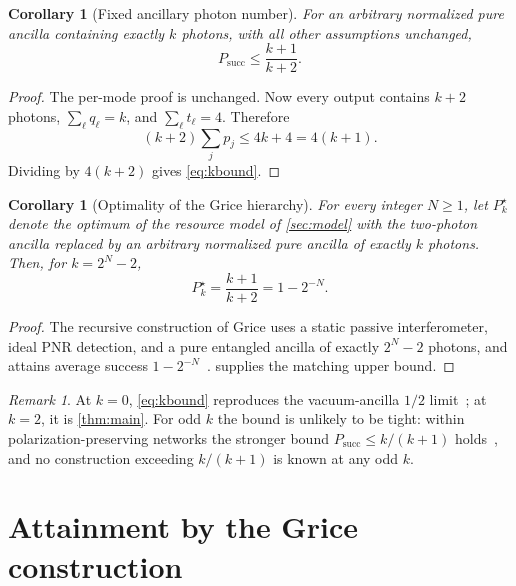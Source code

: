 \documentclass[11pt]{article}
\newtheorem{corollary}[theorem]{Corollary}
\theoremstyle{remark}
\newtheorem{remark}[theorem]{Remark}
\newcommand{\psucc}{P_{\mathrm{succ}}}
\begin{document}
\begin{corollary}[Fixed ancillary photon number]
\label{cor:k}
For an arbitrary normalized pure ancilla containing exactly \(k\) photons,
with all other assumptions unchanged,
\begin{equation}
  \psucc\le\frac{k+1}{k+2}.
  \label{eq:kbound}
\end{equation}
\end{corollary}

\begin{proof}
The per-mode proof is unchanged. Now every output contains \(k+2\) photons,
\(\sum_\ell q_\ell=k\), and \(\sum_\ell t_\ell=4\). Therefore
\begin{equation}
  (k+2)\sum_jp_j\le4k+4=4(k+1).
\end{equation}
Dividing by \(4(k+2)\) gives \cref{eq:kbound}.
\end{proof}

\begin{corollary}[Optimality of the Grice hierarchy]
\label{cor:hierarchy}
For every integer \(N\ge1\), let \(P_k^\star\) denote the optimum of the
resource model of \cref{sec:model} with the two-photon ancilla replaced by an
arbitrary normalized pure ancilla of exactly \(k\) photons. Then, for
\(k=2^N-2\),
\begin{equation}
  P_k^\star=\frac{k+1}{k+2}=1-2^{-N}.
\end{equation}
\end{corollary}

\begin{proof}
The recursive construction of Grice uses a static passive interferometer,
ideal PNR detection, and a pure entangled ancilla of exactly \(2^N-2\)
photons, and attains average success \(1-2^{-N}\)~\cite{Grice2011}.
 supplies the matching upper bound.
\end{proof}

\begin{remark}
At \(k=0\), \cref{eq:kbound} reproduces the vacuum-ancilla \(1/2\)
limit~\cite{Calsamiglia2001}; at \(k=2\), it is \cref{thm:main}. For odd
\(k\) the bound is unlikely to be tight: within polarization-preserving
networks the stronger bound \(P_{\mathrm{succ}}\le k/(k+1)\)
holds~\cite{Olivo2018}, and no construction exceeding \(k/(k+1)\) is known
at any odd \(k\).
\end{remark}

\section{Attainment by the Grice construction}
\label{sec:grice}
\end{document}

